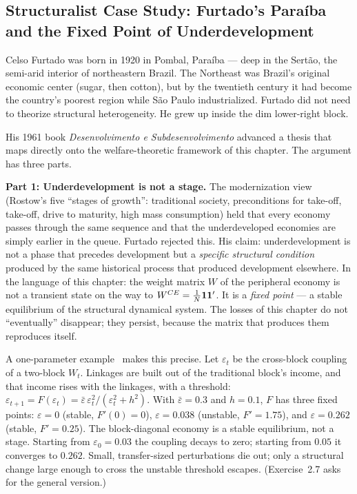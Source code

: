 \documentclass[../structural_economics_book.tex]{subfiles}
\begin{document}
\subsection*{Structuralist Case Study: Furtado's Paraíba and the Fixed Point of Underdevelopment}

Celso Furtado was born in 1920 in Pombal, Para\'{i}ba --- deep in the Sert\~{a}o, the semi-arid interior of northeastern Brazil. The Northeast was Brazil's original economic center (sugar, then cotton), but by the twentieth century it had become the country's poorest region while S\~{a}o Paulo industrialized. Furtado did not need to theorize structural heterogeneity. He grew up inside the dim lower-right block.

His 1961 book \textit{Desenvolvimento e Subdesenvolvimento} advanced a thesis that maps directly onto the welfare-theoretic framework of this chapter. The argument has three parts.

\textbf{Part 1: Underdevelopment is not a stage.} The modernization view (Rostow's five ``stages of growth'': traditional society, preconditions for take-off, take-off, drive to maturity, high mass consumption) held that every economy passes through the same sequence and that the underdeveloped economies are simply earlier in the queue. Furtado rejected this. His claim: underdevelopment is not a phase that precedes development but a \textit{specific structural condition} produced by the same historical process that produced development elsewhere. In the language of this chapter: the weight matrix $W$ of the peripheral economy is not a transient state on the way to $W^{CE} = \frac{1}{N}\mathbf{1}\mathbf{1}'$. It is a \textit{fixed point} --- a stable equilibrium of the structural dynamical system. The losses of this chapter do not ``eventually'' disappear; they persist, because the matrix that produces them reproduces itself.

A one-parameter example \illustrative\ makes this precise. Let $\varepsilon_t$ be the cross-block coupling of a two-block $W_t$. Linkages are built out of the traditional block's income, and that income rises with the linkages, with a threshold: $\varepsilon_{t+1} = F(\varepsilon_t) = \bar\varepsilon\,\varepsilon_t^2/(\varepsilon_t^2 + h^2)$. With $\bar\varepsilon = 0.3$ and $h = 0.1$, $F$ has three fixed points: $\varepsilon = 0$ (stable, $F'(0) = 0$), $\varepsilon = 0.038$ (unstable, $F' = 1.75$), and $\varepsilon = 0.262$ (stable, $F' = 0.25$). The block-diagonal economy is a stable equilibrium, not a stage. Starting from $\varepsilon_0 = 0.03$ the coupling decays to zero; starting from $0.05$ it converges to $0.262$. Small, transfer-sized perturbations die out; only a structural change large enough to cross the unstable threshold escapes. (Exercise~2.7 asks for the general version.)
\end{document}
